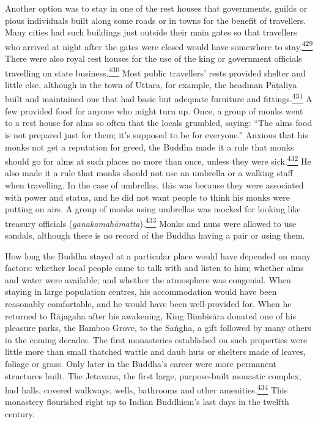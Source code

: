 Another option was to stay in one of the rest houses that governments,
guilds or pious individuals built along some roads or in towns for the
benefit of travellers. Many cities had such buildings just outside their
main gates so that travellers who arrived at night after the gates were
closed would have somewhere to
stay.\label{footprints_split_012.html_fnref429}\hyperref[footprints_split_025.htmlux5cux23fn429]{\textsuperscript{429}}
There were also royal rest houses for the use of the king or government
officials travelling on state
business.\label{footprints_split_012.html_fnref430}\hyperref[footprints_split_025.htmlux5cux23fn430]{\textsuperscript{430}}
Most public travellers' rests provided shelter and little else, although
in the town of Uttara, for example, the headman Pāṭaliya built and
maintained one that had basic but adequate furniture and
fittings.\label{footprints_split_012.html_fnref431}\hyperref[footprints_split_025.htmlux5cux23fn431]{\textsuperscript{431}}
A few provided food for anyone who might turn up. Once, a group of monks
went to a rest house for alms so often that the locals grumbled, saying:
``The alms food is not prepared just for them; it's supposed to be for
everyone.'' Anxious that his monks not get a reputation for greed, the
Buddha made it a rule that monks should go for alms at such places no
more than once, unless they were
sick.\label{footprints_split_012.html_fnref432}\hyperref[footprints_split_025.htmlux5cux23fn432]{\textsuperscript{432}}
He also made it a rule that monks should not use an umbrella or a
walking staff when travelling. In the case of umbrellas, this was
because they were associated with power and status, and he did not want
people to think his monks were putting on airs. A group of monks using
umbrellas was mocked for looking like treasury officials
(\emph{gaṇakamahāmatta}).\label{footprints_split_012.html_fnref433}\hyperref[footprints_split_025.htmlux5cux23fn433]{\textsuperscript{433}}
Monks and nuns were allowed to use sandals, although there is no record
of the Buddha having a pair or using them.

How long the Buddha stayed at a particular place would have depended on
many factors: whether local people came to talk with and listen to him;
whether alms and water were available; and whether the atmosphere was
congenial. When staying in large population centres, his accommodation
would have been reasonably comfortable, and he would have been
well-provided for. When he returned to Rājagaha after his awakening,
King Bimbisāra donated one of his pleasure parks, the Bamboo Grove, to
the Saṅgha, a gift followed by many others in the coming decades. The
first monasteries established on such properties were little more than
small thatched wattle and daub huts or shelters made of leaves, foliage
or grass. Only later in the Buddha's career were more permanent
structures built. The Jetavana, the first large, purpose-built monastic
complex, had halls, covered walkways, wells, bathrooms and other
amenities.\label{footprints_split_012.html_fnref434}\hyperref[footprints_split_025.htmlux5cux23fn434]{\textsuperscript{434}}
This monastery flourished right up to Indian Buddhism's last days in the
twelfth century.

